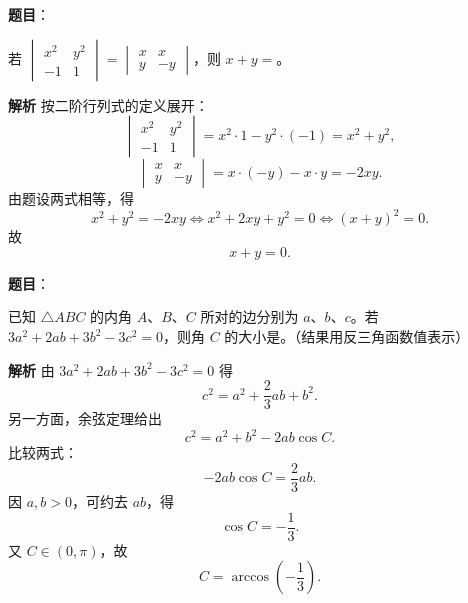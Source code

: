 \begin{answer}

\textbf{题目}：

若 $\begin{vmatrix}x^2&y^2\\-1&1\end{vmatrix}=\begin{vmatrix}x&x\\y&-y\end{vmatrix}$，则 $x+y=$\gkblank{}。

\textbf{解析}
按二阶行列式的定义展开：
\nopagebreak[4]
\[\begin{vmatrix}x^2&y^2\\-1&1\end{vmatrix}=x^2\cdot1-y^2\cdot(-1)=x^2+y^2,\]
\nopagebreak[4]
\[\begin{vmatrix}x&x\\y&-y\end{vmatrix}=x\cdot(-y)-x\cdot y=-2xy.\]
由题设两式相等，得
\nopagebreak[4]
\[x^2+y^2=-2xy\iff x^2+2xy+y^2=0\iff (x+y)^2=0.\]
故
\nopagebreak[4]
\[x+y=0.\]


\end{answer}
\begin{answer}

\textbf{题目}：

已知 $\triangle ABC$ 的内角 $A$、$B$、$C$ 所对的边分别为 $a$、$b$、$c$。若 $3a^2+2ab+3b^2-3c^2=0$，则角 $C$ 的大小是\gkblank{}。（结果用反三角函数值表示）

\textbf{解析}
由 $3a^2+2ab+3b^2-3c^2=0$ 得
\nopagebreak[4]
\[c^2=a^2+\frac23ab+b^2.\]
另一方面，余弦定理给出
\nopagebreak[4]
\[c^2=a^2+b^2-2ab\cos C.\]
比较两式：
\nopagebreak[4]
\[-2ab\cos C=\frac23ab.\]
因 $a,b>0$，可约去 $ab$，得
\nopagebreak[4]
\[\cos C=-\frac13.\]
又 $C\in(0,\pi)$，故
\nopagebreak[4]
\[C=\arccos\left(-\frac13\right).\]


\end{answer}
